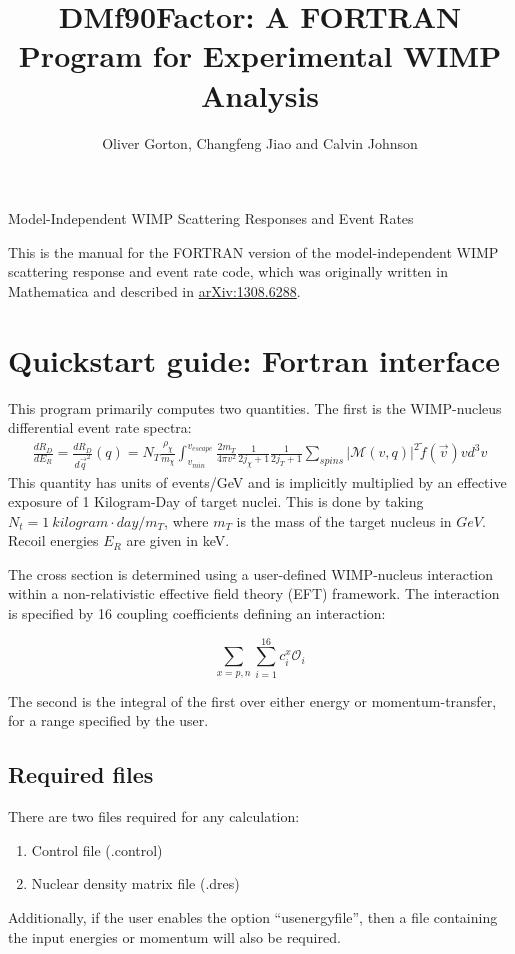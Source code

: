 \documentclass[12pt]{article}
\title{DMf90Factor: A FORTRAN Program for Experimental WIMP Analysis}
\author{Oliver Gorton, Changfeng Jiao and Calvin Johnson}
\begin{document}
\maketitle

{

\centering

Model-Independent WIMP Scattering Responses and Event Rates

}

\tableofcontents

This is the manual for the FORTRAN version of the model-independent WIMP 
scattering response and event rate code, which was originally written in 
Mathematica and described in 
\href{http://arxiv.org/abs/1308.6288v1}{arXiv:1308.6288}.

\clearpage

\section{Quickstart guide: Fortran interface}
This program primarily computes two quantities. The first is the WIMP-nucleus
differential event rate spectra:
\begin{equation}
\begin{split}
        \frac{dR_D}{dE_R} = \frac{dR_D}{d\vec{q}^2}(q)
	= N_T\frac{\rho_\chi}{m_\chi}\int_{v_{min}}^{v_{escape}} 
	\frac{2m_T}{4\pi v^2}\frac{1}{2j_\chi+1}\frac{1}{2j_T+1}
	\sum_{spins}|\mathcal{M}(v,q)|^2  \tilde{f}(\vec{v})vd^3v
\end{split}
\end{equation}
This quantity has units of events/GeV and is implicitly multiplied by
an effective exposure of 1 Kilogram-Day of target nuclei. This is done by
taking $N_t = 1\ kilogram\cdot day / m_T$, where $m_T$ is the mass of the target
nucleus in $GeV$. Recoil energies $E_R$ are given in keV.

The cross section is determined using a user-defined WIMP-nucleus interaction
within a non-relativistic effective field theory (EFT) framework. The
interaction is specified by 16 coupling coefficients defining an interaction:

\begin{equation}
	\sum_{x=p,n}\sum_{i=1}^{16} c_i^x \mathcal{O}_i
\end{equation}

The second is the integral of the first over either energy or momentum-transfer,
for a range specified by the user. 

\subsection{Required files}
There are two files required for any calculation:
\begin{enumerate}
    \item Control file (.control)
    \item Nuclear density matrix file (.dres)
\end{enumerate}
Additionally, if the user enables the option ``usenergyfile'', then a file
containing the input energies or momentum will also be required.
\end{document}
